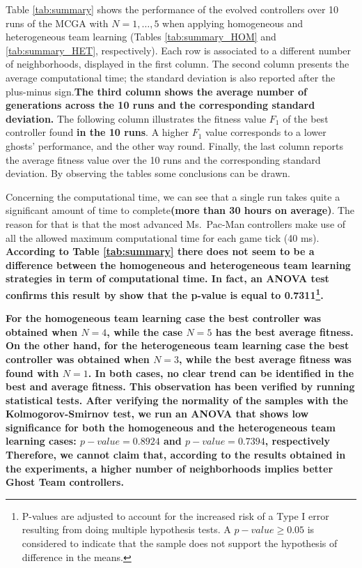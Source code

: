 \documentclass[journal]{IEEEtran}
\begin{document}
Table \ref{tab:summary} shows the performance of the evolved controllers over 10 runs of the MCGA with $N=1,\ldots,5$ when applying homogeneous and heterogeneous team learning (Tables \ref{tab:summary_HOM} and \ref{tab:summary_HET}, respectively). Each row is associated to a different number of neighborhoods, displayed in the first column. The second column presents the average computational time; the standard deviation is also reported after the plus-minus sign.\textbf{The third column shows the average number of generations across the 10 runs and the corresponding standard deviation.} The following column illustrates the fitness value $F_1$ of the best controller found \textbf{in the 10 runs}. A higher $F_1$ value corresponds to a lower ghosts' performance, and the other way round. Finally, the last column reports the average fitness value over the 10 runs and the corresponding standard deviation. By observing the tables some conclusions can be drawn.

Concerning the computational time, we can see that a single run takes
quite a significant amount of time to complete\textbf{(more than 30 hours
on average)}. The reason for that is that the most advanced
Ms.\  Pac-Man controllers make use of all the allowed maximum
computational time for each game tick (40 ms). \textbf{According to Table \ref{tab:summary} there does not seem to be a difference between the homogeneous and heterogeneous team learning strategies in term of computational time. In fact, an ANOVA test confirms this result by show that the p-value is equal to 0.7311\footnote{P-values are adjusted to account for the increased risk of a Type I error resulting from doing multiple hypothesis tests. A $p-value\geq0.05$ is considered to indicate that the sample does not support the hypothesis of difference in the means.}.}

\textbf{For the homogeneous team learning case the best controller was obtained
when $N=4$, while the case $N=5$ has the best average fitness. On the other hand, for the heterogeneous team learning case the best controller was obtained when $N=3$, while the best average fitness was found with $N=1$. In both cases, no clear trend can be identified in the best and average fitness. This observation has been verified by running statistical tests. After verifying the normality of the samples with the Kolmogorov-Smirnov test, we run an ANOVA that shows low significance for both the homogeneous and the heterogeneous team learning cases: $p-value=0.8924$ and $p-value=0.7394$, respectively Therefore, we cannot claim that, according to the results obtained in the experiments, a higher number of neighborhoods implies better Ghost Team controllers.}
\end{document}
